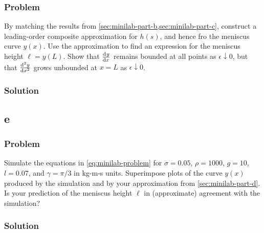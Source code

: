 \documentclass[12pt,twoside]{article}
\begin{document}
\subsubsection*{Problem}
By matching the results from \cref{sec:minilab-part-b,sec:minilab-part-c},
construct a leading-order composite approximation for $h(s)$, and hence fro the
meniscus curve $y(x)$. Use the approximation to find an expression for the
meniscus height $\ell=y(L)$. Show that $\od{y}{x}$ remains bounded at all
points as $\epsilon\downarrow0$, but that $\od[2]{y}{x}$ grows unbounded at
$x=L$ as $\epsilon\downarrow0$.
\subsubsection*{Solution}
\todo{}

\subsection{e}
\subsubsection*{Problem}
Simulate the equations in \cref{eq:minilab-problem} for $\sigma=0.05$,
$\rho=1000$, $g=10$, $l=0.07$, and $\gamma=\pi/3$ in kg-m-s units. Superimpose
plots of the curve $y(x)$ produced by the simulation and by your approximation
from \cref{sec:minilab-part-d}. Is your prediction of the meniscus height $\ell$
in (approximate) agreement with the simulation?
\subsubsection*{Solution}
\todo{}
\end{document}
